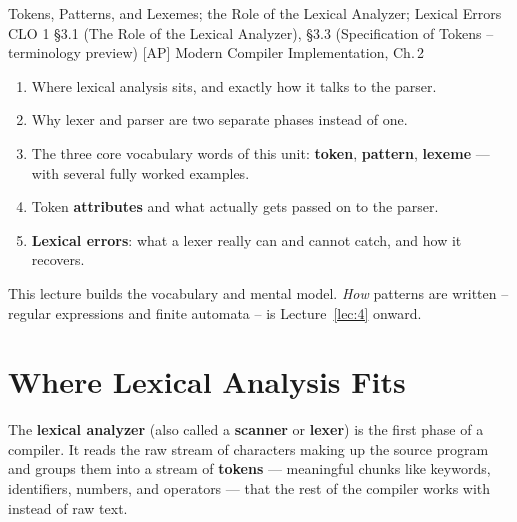 \documentclass[full-course-notes.tex]{subfiles}
\begin{document}
  {Tokens, Patterns, and Lexemes; the Role of the Lexical Analyzer; Lexical Errors}
  {CLO 1}
  {\S3.1 (The Role of the Lexical Analyzer), \S3.3 (Specification of Tokens -- terminology preview)}
  {[AP] Modern Compiler Implementation, Ch.\,2}
\setcounter{section}{0}
\makelecturetitle

\begin{coreidea}
\begin{enumerate}
  \item Where lexical analysis sits, and exactly how it talks to the parser.
  \item Why lexer and parser are two separate phases instead of one.
  \item The three core vocabulary words of this unit: \textbf{token}, \textbf{pattern},
  \textbf{lexeme} --- with several fully worked examples.
  \item Token \textbf{attributes} and what actually gets passed on to the parser.
  \item \textbf{Lexical errors}: what a lexer really can and cannot catch, and how it recovers.
\end{enumerate}
This lecture builds the vocabulary and mental model. \emph{How} patterns are written --
regular expressions and finite automata -- is Lecture~\ref{lec:4} onward.
\end{coreidea}

\section{Where Lexical Analysis Fits}
\label{sec:l3-where-lexical-fits}

\dbtag The \textbf{lexical analyzer} (also called a \textbf{scanner} or \textbf{lexer}) is the
first phase of a compiler. It reads the raw stream of characters making up the source program
and groups them into a stream of \textbf{tokens} --- meaningful chunks like keywords,
identifiers, numbers, and operators --- that the rest of the compiler works with instead of raw
text.

\begin{center}
\end{center}
\end{document}
